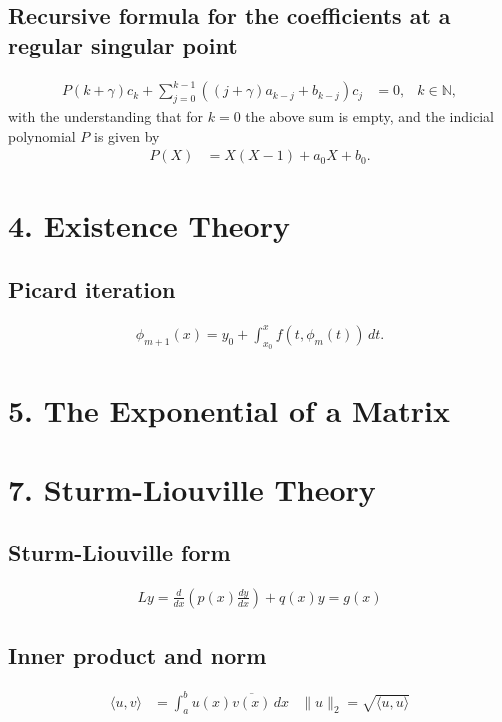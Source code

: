 \documentclass[11pt,icelandic]{article}
\begin{document}
\subsection*{Recursive formula for the coefficients at a regular singular point}
\begin{align*}
P(k+\gamma)c_k + \sum_{j=0}^{k-1} ((j+\gamma)a_{k-j} + b_{k-j}) c_j &=0, &k\in \mathbb N,
\end{align*}
with the understanding that for $k=0$ the above sum is empty, and the indicial 
polynomial $P$ is given by 
\begin{align*}
 P(X) &= X(X-1) + a_0X + b_0.
\end{align*}

\section*{4. Existence Theory}

\subsection*{Picard iteration}
\begin{align*}
  \phi_{m+1}(x) = y_0 + \int_{x_0}^x f(t,\phi_m(t))\, dt.
\end{align*}

\section*{5. The Exponential of a Matrix}

\section*{7. Sturm-Liouville Theory}

\subsection*{Sturm-Liouville form}
\begin{align*}
 Ly = \frac{d}{dx} \left(p(x)\frac{dy}{dx}\right) + q(x)y = g(x)
\end{align*}

\subsection*{Inner product and norm}
\begin{align*}
 \langle u,v\rangle &= \int_a^b u(x)\overline {v(x)}\, dx 
 &  \|u\|_2 = \sqrt{\langle u,u\rangle }
\end{align*}
\end{document}
